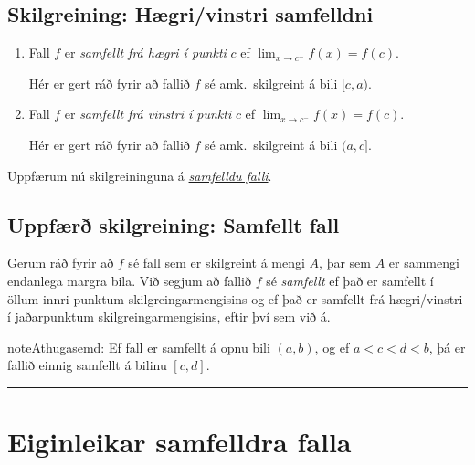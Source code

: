 \documentclass[b5paper,10pt,icelandic]{sphinxmanual}
\begin{document}
\subsection{Skilgreining: Hægri/vinstri samfelldni}
\label{kafli02:skilgreining-haegri-vinstri-samfelldni}\begin{enumerate}
\item {} 
Fall \(f\) er \emph{samfellt frá hægri í punkti} \(c\) ef
\(\lim_{x\rightarrow c^+}f(x)=f(c)\).

Hér er gert ráð fyrir að fallið \(f\) sé amk. skilgreint á
bili \([c, a)\).

\item {} 
Fall \(f\) er \emph{samfellt frá vinstri í punkti} \(c\) ef
\(\lim_{x\rightarrow c^-}f(x)=f(c)\).

Hér er gert ráð fyrir að fallið \(f\) sé amk. skilgreint á
bili \((a, c]\).

\end{enumerate}

Uppfærum nú skilgreininguna á {\hyperref[kafli02:skilgrsamfellt]{\emph{samfelldu falli}}}.


\subsection{Uppfærð skilgreining: Samfellt fall}
\label{kafli02:index-11}\label{kafli02:uppfaer-skilgreining-samfellt-fall}
Gerum ráð fyrir að \(f\) sé fall sem er skilgreint á mengi
\(A\), þar sem \(A\) er sammengi endanlega margra bila. Við
segjum að fallið \(f\) sé \emph{samfellt} ef það er samfellt í öllum
innri punktum skilgreingarmengisins og ef það er samfellt frá
hægri/vinstri í jaðarpunktum skilgreingarmengisins, eftir því sem við á.

\begin{notice}{note}{Athugasemd:}
Ef fall er samfellt á opnu bili \((a,b)\), og ef \(a<c<d<b\), þá
er fallið einnig samfellt á bilinu \([c,d]\).
\end{notice}


\bigskip\hrule{}\bigskip



\section{Eiginleikar samfelldra falla}
\label{kafli02:eiginleikar-samfelldra-falla}
\end{document}

